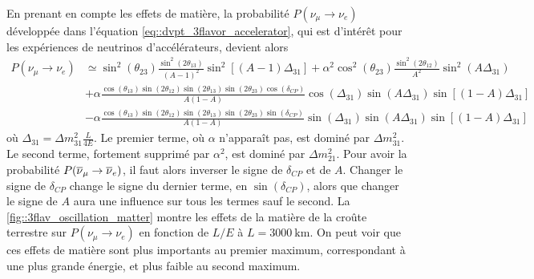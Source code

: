       En prenant en compte les effets de matière, la probabilité $P(\nu_{\mu}\to\nu_e)$ développée dans l'équation \eqref{eq::dvpt_3flavor_accelerator}, qui est d'intérêt pour les expériences de neutrinos d'accélérateurs, devient alors\cite{Giganti2017}
      \begin{equation}\label{eq::proba_matter_3flavors}
        \begin{split}
          P(\nu_{\mu}\to\nu_e) & \simeq  \sin^2(\theta_{23})\frac{\sin^2(2\theta_{13})}{(A-1)^2}\sin^2\left[(A-1)\Delta_{31}\right]
          + \alpha^2\cos^2(\theta_{23})\frac{\sin^2(2\theta_{12})}{A^2}\sin^2\left(A\Delta_{31}\right) \\ 
          & + \alpha\frac{\cos(\theta_{13})\sin(2\theta_{12})\sin(2\theta_{13})\sin(2\theta_{23})\cos(\delta_{CP})}{A(1-A)}\cos\left(\Delta_{31}\right)\sin\left(A\Delta_{31}\right)\sin\left[(1-A)\Delta_{31}\right] \\
          & - \alpha\frac{\cos(\theta_{13})\sin(2\theta_{12})\sin(2\theta_{13})\sin(2\theta_{23})\sin(\delta_{CP})}{A(1-A)}\sin\left(\Delta_{31}\right)\sin\left(A\Delta_{31}\right)\sin\left[(1-A)\Delta_{31}\right]
        \end{split}
      \end{equation}
      où $\Delta_{31}=\Delta m^2_{31}\frac{L}{4E}$.
      Le premier terme, où $\alpha$ n'apparaît pas, est dominé par $\Delta m^2_{31}$. Le second terme, fortement supprimé par $\alpha^2$, est dominé par $\Delta m^2_{21}$. Pour avoir la probabilité $P(\overline{\nu}_{\mu}\to\overline{\nu}_e)$, il faut alors inverser le signe de $\delta_{CP}$ et de $A$. Changer le signe de $\delta_{CP}$ change le signe du dernier terme, en $\sin(\delta_{CP})$, alors que changer le signe de $A$ aura une influence sur tous les termes sauf le second. La \autoref{fig::3flav_oscillation_matter} montre les effets de la matière de la croûte terrestre sur $P(\nu_{\mu}\to\nu_e)$ en fonction de $L/E$ à $L=\SI{3000}{\kilo\meter}$. On peut voir que ces effets de matière sont plus importants au premier maximum, correspondant à une plus grande énergie, et plus faible au second maximum.

